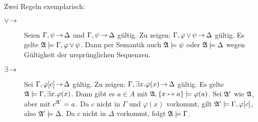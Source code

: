 Zwei Regeln exemplarisch:

\begin{description}
  \item[$\operatorname{\vee}\operatorname{\rightarrow}$]
  Seien $\Gamma,\psi\operatorname{\rightarrow}\Delta$ und $\Gamma,\psi\operatorname{\rightarrow}\Delta$ gültig.
  Zu zeigen: $\Gamma,\varphi\operatorname{\vee}\psi\operatorname{\rightarrow}\Delta$ gültig. Es gelte $\mathfrak{A}\models\Gamma,\varphi\operatorname{\vee}\psi$.
  Dann per Semantik auch $\mathfrak{A}\models\psi$ oder $\mathfrak{A}\models\Delta$ wegen Gültigkeit der
  ursprünglichen Sequenzen.
  
  \item[$\exists\operatorname{\rightarrow}$]
  Sei $\Gamma,\varphi[c]\operatorname{\rightarrow}\Delta$ gültig. Zu zeigen: $\Gamma,\exists x.\varphi(x)\operatorname{\rightarrow}\Delta$ gültig.
  Es gelte $\mathfrak{A}\models\Gamma,\exists x.\varphi(x)$. Dann gibt es $a\in A$ mit $\mathfrak{A},\left\{x\mapsto a\right\}\models\varphi(a)$.
  Sei $\mathfrak{A}'$ wie $\mathfrak{A}$, aber mit $c^{\mathfrak{A}'}=a$. Da $c$ nicht in $\Gamma$ und $\varphi(x)$ vorkommt,
  gilt $\mathfrak{A}'\models\Gamma,\varphi[c]$, also $\mathfrak{A}'\models\Delta$. Da $c$ nicht in $\Delta$ vorkommt,
  folgt $\mathfrak{A}\models\Gamma$.
\end{description}


